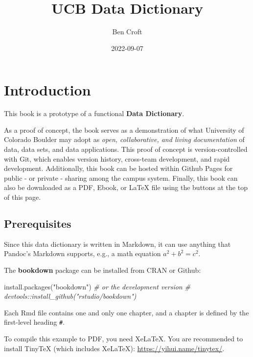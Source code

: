 \documentclass[
]{book}
\title{UCB Data Dictionary}
\author{Ben Croft}
\date{2022-09-07}
\newenvironment{Shaded}{\begin{snugshade}}{\end{snugshade}}
\newcommand{\CommentTok}[1]{\textcolor[rgb]{0.56,0.35,0.01}{\textit{#1}}}
\newcommand{\FunctionTok}[1]{\textcolor[rgb]{0.00,0.00,0.00}{#1}}
\newcommand{\NormalTok}[1]{#1}
\newcommand{\StringTok}[1]{\textcolor[rgb]{0.31,0.60,0.02}{#1}}
\begin{document}
\maketitle

{
\setcounter{tocdepth}{1}
\tableofcontents
}
\hypertarget{introduction}{%
\chapter{Introduction}\label{introduction}}

This book is a prototype of a functional \textbf{Data Dictionary}.

As a proof of concept, the book serves as a demonstration of what University of Colorado Boulder may adopt as \emph{open, collaborative, and living documentation} of data, data sets, and data applications. This proof of concept is version-controlled with Git, which enables version history, cross-team development, and rapid development. Additionally, this book can be hosted within Github Pages for public - or private - sharing among the campus system. Finally, this book can also be downloaded as a PDF, Ebook, or LaTeX file using the buttons at the top of this page.

\hypertarget{prerequisites}{%
\section{Prerequisites}\label{prerequisites}}

Since this data dictionary is written in Markdown, it can use anything that Pandoc's Markdown supports, e.g., a math equation \(a^2 + b^2 = c^2\).

The \textbf{bookdown} package can be installed from CRAN or Github:

\begin{Shaded}
\begin{Highlighting}[]
\FunctionTok{install.packages}\NormalTok{(}\StringTok{"bookdown"}\NormalTok{)}
\CommentTok{\# or the development version}
\CommentTok{\# devtools::install\_github("rstudio/bookdown")}
\end{Highlighting}
\end{Shaded}

Each Rmd file contains one and only one chapter, and a chapter is defined by the first-level heading \texttt{\#}.

To compile this example to PDF, you need XeLaTeX. You are recommended to install TinyTeX (which includes XeLaTeX): \url{https://yihui.name/tinytex/}.
\end{document}
